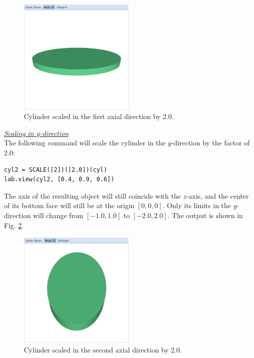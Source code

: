 \documentclass{article}
\begin{document}
\begin{figure}[!ht]
\begin{center}
\includegraphics[width=0.5\textwidth]{img/scale-1.png}
\end{center}
\vspace{-2mm}
\caption{Cylinder scaled in the first axial direction by 2.0.}
\label{fig:scale-1}
\end{figure}

\noindent
\underline{\em Scaling in $y$-direction}\\

The following command will 
scale the cylinder in the $y$-direction by the factor of 2.0: 

\begin{verbatim}
cyl2 = SCALE([2])([2.0])(cyl)
lab.view(cyl2, [0.4, 0.9, 0.6])
\end{verbatim}
The axis of the resulting object will still
coincide with the $z$-axis, and the center of its bottom face will
still be at the origin $[0, 0, 0]$. Only its limits in the $y$-direction will change 
from $[-1.0, 1.0]$ to $[-2.0, 2.0]$.
The output is shown in Fig. \ref{fig:scale-2}.

\newpage

\begin{figure}[!ht]
\begin{center}
\includegraphics[width=0.5\textwidth]{img/scale-2.png}
\end{center}
\vspace{-2mm}
\caption{Cylinder scaled in the second axial direction by 2.0.}
\label{fig:scale-2}
\end{figure}
\end{document}

